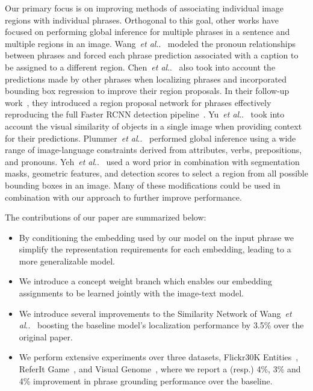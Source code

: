 \documentclass[runningheads]{llncs}
\makeatletter
\DeclareRobustCommand\onedot{\futurelet\@let@token\@onedot}
\def\@onedot{\ifx\@let@token.\else.\null\fi\xspace}
\def\etal{\emph{et al}\onedot}
\makeatother
\begin{document}
Our primary focus is on improving methods of associating individual image regions with individual phrases. Orthogonal to this goal, other works have focused on performing global inference for multiple phrases in a sentence and multiple regions in an image.  Wang~\etal~\cite{wang2016matching} modeled the pronoun relationships between phrases and forced each phrase prediction associated with a caption to be assigned to a different region. Chen~\etal~\cite{ChenICMR2017} also took into account the predictions made by other phrases when localizing phrases and incorporated bounding box regression to improve their region proposals.  In their follow-up work~\cite{ChenICCV2017}, they introduced a region proposal network for phrases effectively reproducing the full Faster RCNN detection pipeline~\cite{renNIPS15fasterrcnn}.  Yu~\etal~\cite{yu2016context} took into account the visual similarity of objects in a single image when providing context for their predictions. Plummer~\etal~\cite{plummerPLCLC2017} performed global inference using a wide range of image-language constraints derived from attributes, verbs, prepositions, and pronouns.  Yeh~\etal~\cite{yehNIPS2017} used a word prior in combination with segmentation masks, geometric features, and detection scores to select a region from all possible bounding boxes in an image. Many of these modifications could be used in combination with our approach to further improve performance.

The contributions of our paper are summarized below:

\begin{itemize}
\item By conditioning the embedding used by our model on the input phrase we simplify the representation requirements for each embedding, leading to a more generalizable model.
\item We introduce a concept weight branch which enables our embedding assignments to be learned jointly with the image-text model.
\item We introduce several improvements to the Similarity Network of Wang~\etal~\cite{wangTwoBranch2017} boosting the baseline model's localization performance by 3.5\% over the original paper.
\item We perform extensive experiments over three datasets, Flickr30K Entities~\cite{flickrentitiesijcv}, ReferIt Game~\cite{kazemzadeh-EtAl:2014:EMNLP2014}, and Visual Genome~\cite{krishnavisualgenome}, where we report a (resp.) 4\%, 3\% and 4\% improvement in phrase grounding performance over the baseline.
\end{itemize}
\end{document}
